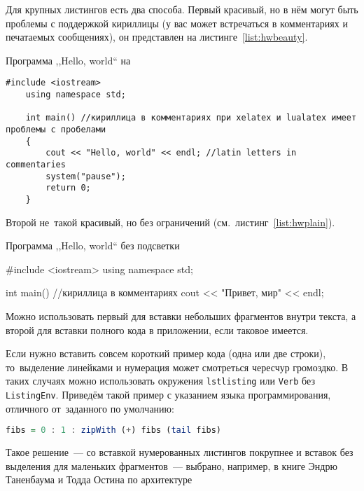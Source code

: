 Для крупных листингов есть два способа. Первый красивый, но в нём могут быть проблемы с поддержкой кириллицы (у вас может встречаться в комментариях и
печатаемых сообщениях), он представлен на листинге~\ref{list:hwbeauty}.
\begin{ListingEnv}[!h]%
    \captiondelim{ } %
    \caption{Программа ,,Hello, world`` на \protect\cpp}
    \label{list:hwbeauty}
    \begin{lstlisting}[language={[ISO]C++}]
	#include <iostream>
	using namespace std;

	int main() //кириллица в комментариях при xelatex и lualatex имеет проблемы с пробелами
	{
		cout << "Hello, world" << endl; //latin letters in commentaries
		system("pause");
		return 0;
	}
    \end{lstlisting}
\end{ListingEnv}%
Второй не~такой красивый, но без ограничений (см.~листинг~\ref{list:hwplain}).
\begin{ListingEnv}[!h]
    \captiondelim{ } %
    \caption{Программа ,,Hello, world`` без подсветки}
    \label{list:hwplain}
    \begin{Verb}
        
        #include <iostream>
        using namespace std;
        
        int main() //кириллица в комментариях
        {
            cout << "Привет, мир" << endl;
        }
    \end{Verb}
\end{ListingEnv}

Можно использовать первый для вставки небольших фрагментов
внутри текста, а второй для вставки полного
кода в приложении, если таковое имеется.

Если нужно вставить совсем короткий пример кода (одна или две строки),
то~выделение  линейками и нумерация может смотреться чересчур громоздко.
В таких случаях можно использовать окружения \texttt{lstlisting} или
\texttt{Verb} без \texttt{ListingEnv}. Приведём такой пример
с указанием языка программирования, отличного от~заданного по умолчанию:
\begin{lstlisting}[language=Haskell]
fibs = 0 : 1 : zipWith (+) fibs (tail fibs)
\end{lstlisting}
Такое решение~--- со вставкой нумерованных листингов покрупнее
и вставок без выделения для маленьких фрагментов~--- выбрано,
например, в книге Эндрю Таненбаума и Тодда Остина по архитектуре

